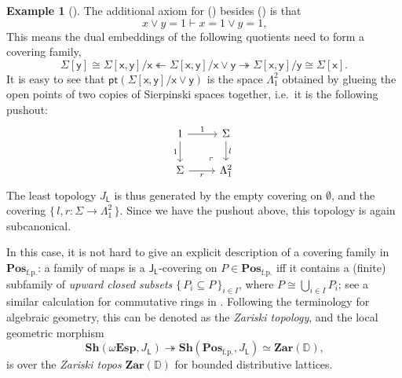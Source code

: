 \documentclass[a4paper,12pt]{amsart}
\theoremstyle{definition}
\newtheorem{example}[theorem]{Example}
\newcommand{\mb}[1]{\mathbf{#1}}
\newcommand{\mbb}[1]{\mathbb{#1}}
\newcommand{\mr}[1]{\mathrm{#1}}
\newcommand{\ms}[1]{\mathsf{#1}}
\newcommand{\Pos}{\mb{Pos}}
\newcommand{\sh}{\mb{Sh}}
\newcommand{\set}[1]{\{\,#1\,\}}
\newcommand{\surj}{\twoheadrightarrow}
\newcommand{\fp}{_{\mr{f.p.}}}
\newcommand{\emp}{\emptyset}
\newcommand{\pt}{\ms{pt}}
\newcommand{\wTop}{\omega\mb{Esp}}
\begin{document}
\begin{example}[\AxiomL]
  The additional axiom for (\AxiomL) besides (\AxiomNT) is that 
  \[ x \vee y = 1 \vdash x = 1 \vee y = 1\text{,} \] 
  This means the dual embeddings of the following quotients need to form a covering family,
  \[ \Sigma[\ms{y}] \cong \Sigma[\ms{x},\ms{y}]/\ms{x} \twoheadleftarrow \Sigma[\ms{x},\ms{y}]/\ms{x}\vee \ms{y} \surj \Sigma[\ms{x},\ms{y}]/\ms{y} \cong \Sigma[\ms{x}]\text{.} \]
  It is easy to see that $\pt(\Sigma[\ms{x},\ms{y}]/\ms{x} \vee \ms{y})$ is the space $\Lambda^2_1$ obtained by glueing the open points of two copies of Sierpinski spaces together, i.e.\ it is the following pushout:
  \[
  \begin{tikzcd}
    1 \ar[d, "1"'] \ar[r, "1"] & \Sigma \ar[d, "l"] \\ 
    \Sigma \ar[r, "r"'] & \Lambda^2_1
    \arrow["\lrcorner"{anchor=center, pos=0.125, rotate=180}, draw=none, from=2-2, to=1-1]    
  \end{tikzcd}
  \]
  The least topology $J_{\ms L}$ is thus generated by the empty covering on $\emp$, and the covering $\set{l,r : \Sigma \to \Lambda^2_1}$. Since we have the pushout above, this topology is again subcanonical. 
  
  In this case, it is not hard to give an explicit description of a covering family in $\Pos\fp$: a family of maps is a $\ms J_{\ms L}$-covering on $P \in \Pos\fp$ iff it contains a (finite) subfamily of \emph{upward closed subsets} $\set{P_i\subseteq P}_{i\in I}$, where $P \cong \bigcup_{i\in I}P_i$; see a similar calculation for commutative rings in \citet[VIII. 6]{maclane1992sheaves}. Following the terminology for algebraic geometry, this can be denoted as the \emph{Zariski topology}, and the local geometric morphism
  \[ \sh(\wTop,J_{\ms L}) \surj \sh(\Pos\fp,J_{\ms L}) \simeq \mb{Zar}(\mbb D)\text{,} \]
  is over the \emph{Zariski topos} $\mb{Zar}(\mbb D)$ for bounded distributive lattices.
\end{example}
\end{document}
